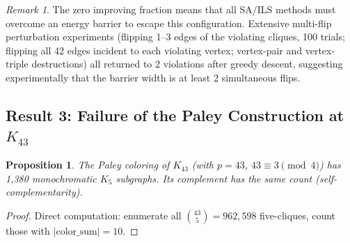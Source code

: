\documentclass[11pt,a4paper]{article}
\theoremstyle{plain}
\newtheorem{proposition}[theorem]{Proposition}
\theoremstyle{remark}
\newtheorem{remark}[theorem]{Remark}
\newcommand{\abs}[1]{\lvert #1 \rvert}
\begin{document}
\begin{remark}
The zero improving fraction means that all SA/ILS methods must
overcome an energy barrier to escape this configuration. Extensive
multi-flip perturbation experiments (flipping 1--3 edges of the
violating cliques, 100 trials; flipping all 42 edges incident to
each violating vertex; vertex-pair and vertex-triple destructions)
all returned to 2 violations after greedy descent, suggesting
experimentally that the barrier width is at least 2 simultaneous
flips.
\end{remark}

\subsection{Result 3: Failure of the Paley Construction at $K_{43}$}

\begin{proposition}\label{prop:paley-fail}
The Paley coloring of $K_{43}$ (with $p = 43$, $43 \equiv 3 \pmod{4}$)
has 1{,}380 monochromatic $K_5$ subgraphs. Its complement has the
same count (self-complementarity).
\end{proposition}

\begin{proof}
Direct computation: enumerate all $\binom{43}{5} = 962{,}598$
five-cliques, count those with $\abs{\text{color\_sum}} = 10$.
\end{proof}
\end{document}
